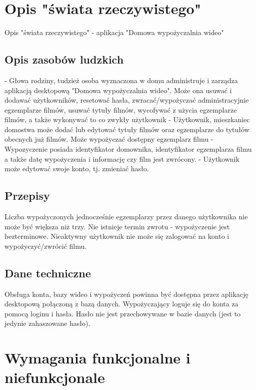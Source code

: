 \documentclass{article}
\begin{document}
	\section{Opis "świata rzeczywistego"}
	Opis "świata rzeczywistego" - aplikacja "Domowa wypożyczalnia wideo"
	\subsection{Opis zasobów ludzkich}
		- Głowa rodziny, tudzież osoba wyznaczona w domu administruje i zarządza aplikacją desktopową "Domowa wypożyczalnia wideo". Może ona usuwać i dodawać użytkowników, resetować hasła, zwracać/wypożyczać administracyjnie egzemplarze filmów, usuwać tytuły filmów, wycofywać z użycia egzemplarze filmów, a także wykonywać to co zwykły użytkownik
		- Użytkownik, mieszkaniec domostwa może dodać lub edytować tytuły filmów oraz egzemplarze do tytułów obecnych już filmów. Może wypożyczać dostępny egzemplarz filmu
		- Wypozyczenie posiada identyfikator domownika, identyfikator egzemplarza filmu a także datę wypożyczenia i informację czy film jest zwrócony.
		- Użytkownik może edytować swoje konto, tj. zmieniać hasło.
	\subsection{Przepisy}
		Liczba wypożyczonych jednocześnie egzemplarzy przez danego użytkownika nie może być większa niż trzy. Nie istnieje termin zwrotu - wypożyczenie jest bezterminowe. Nieaktywny użytkownik nie może się zalogować na konto i wypożyczyć/zwrócić filmu.
	\subsection{Dane techniczne}
	\label{dane_techniczne}
		 Obsługa konta, bazy wideo i wypożyczeń powinna być dostępna przez aplikację desktopową połączoną z bazą danych.
		Wypożyczający loguje się do konta za pomocą loginu i hasła. Hasło nie jest przechowywane w bazie danych (jest to jedynie zahaszowane hasło).
	\newpage
	\section{Wymagania funkcjonalne i niefunkcjonale}
\end{document}
